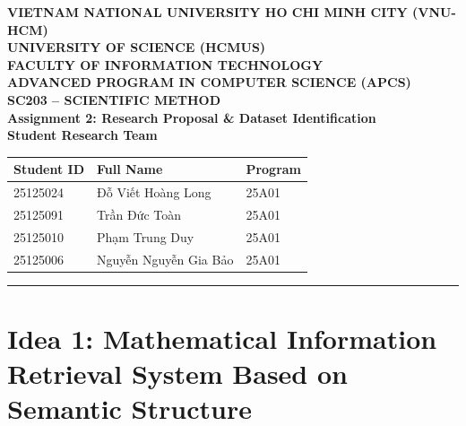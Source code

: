 \documentclass[11pt,a4paper]{article}
\begin{document}
\renewcommand{\contentsname}{Table of Contents}
\renewcommand{\abstractname}{Abstract}
\renewcommand{\refname}{References}

\begin{center}
    {\large \textbf{VIETNAM NATIONAL UNIVERSITY HO CHI MINH CITY (VNU-HCM)}}\\[0.2em]
    {\large \textbf{UNIVERSITY OF SCIENCE (HCMUS)}}\\[0.5em]
    {\large \textbf{FACULTY OF INFORMATION TECHNOLOGY}}\\[0.5em]
    {\large \textbf{ADVANCED PROGRAM IN COMPUTER SCIENCE (APCS)}}\\[1.5em]

    {\LARGE \textbf{SC203 -- SCIENTIFIC METHOD}}\\[5.6em]
    {\Large \textbf{Assignment 2: Research Proposal \& Dataset Identification}}\\[7.5em]

    \textbf{\large Student Research Team}\\[0.8em]
    \begin{tabular}{lll}
        \toprule
        \textbf{Student ID} & \textbf{Full Name} & \textbf{Program} \\
        \midrule
        25125024 & Đỗ Viết Hoàng Long   & 25A01 \\
        25125091 & Trần Đức Toàn        & 25A01 \\
        25125010 & Phạm Trung Duy       & 25A01 \\
        25125006 & Nguyễn Nguyễn Gia Bảo & 25A01 \\
        \bottomrule
    \end{tabular}
\end{center}

\newpage

\vspace{1.5em}
\hrule
\vspace{1.5em}

\tableofcontents

\newpage

\section{Idea 1: Mathematical Information Retrieval System Based on Semantic Structure}
\end{document}
